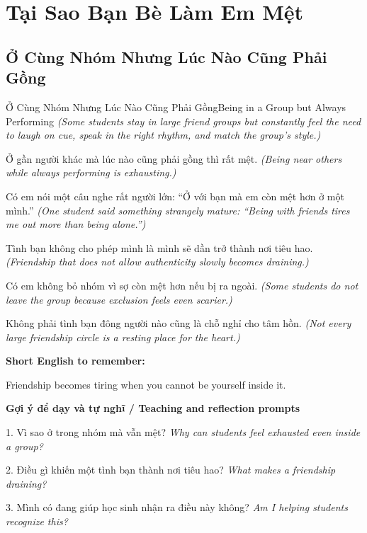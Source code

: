 \chapter{Tại Sao Bạn Bè Làm Em Mệt}

\section{Ở Cùng Nhóm Nhưng Lúc Nào Cũng Phải Gồng}
\begin{truyen}{Ở Cùng Nhóm Nhưng Lúc Nào Cũng Phải Gồng}{Being in a Group but Always Performing}
\textit{(Some students stay in large friend groups but constantly feel the need to laugh on cue, speak in the right rhythm, and match the group's style.)}

Ở gần người khác mà lúc nào cũng phải gồng thì rất mệt.
\textit{(Being near others while always performing is exhausting.)}

Có em nói một câu nghe rất người lớn: “Ở với bạn mà em còn mệt hơn ở một mình.”
\textit{(One student said something strangely mature: “Being with friends tires me out more than being alone.”)}

Tình bạn không cho phép mình là mình sẽ dần trở thành nơi tiêu hao.
\textit{(Friendship that does not allow authenticity slowly becomes draining.)}

Có em không bỏ nhóm vì sợ còn mệt hơn nếu bị ra ngoài.
\textit{(Some students do not leave the group because exclusion feels even scarier.)}

\end{truyen}

\begin{baihoc}
Không phải tình bạn đông người nào cũng là chỗ nghỉ cho tâm hồn.
\textit{(Not every large friendship circle is a resting place for the heart.)}
\end{baihoc}

\begin{ghinhoanh}
\textbf{Short English to remember:}

Friendship becomes tiring when you cannot be yourself inside it.

\end{ghinhoanh}

\begin{tuhocnhanh}
\textbf{Gợi ý để dạy và tự nghĩ / Teaching and reflection prompts}

1. Vì sao ở trong nhóm mà vẫn mệt? \textit{Why can students feel exhausted even inside a group?}

2. Điều gì khiến một tình bạn thành nơi tiêu hao? \textit{What makes a friendship draining?}

3. Mình có đang giúp học sinh nhận ra điều này không? \textit{Am I helping students recognize this?}
\end{tuhocnhanh}
\ngancach


